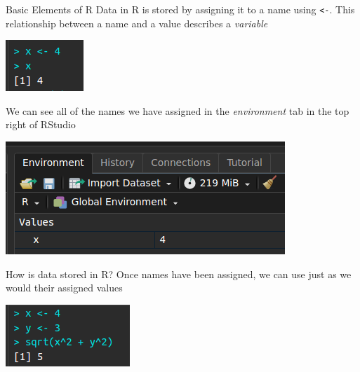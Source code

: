 \documentclass{beamer}
\begin{document}
\begin{frame}{Basic Elements of R}
Data in R is stored by assigning it to a name using \texttt{<-}. This relationship between a name and a value describes a \textit{variable}

\begin{center}
\includegraphics[scale=0.6]{r_assign_4.png}
\end{center}
We can see all of the names we have assigned in the \textit{environment} tab in the top right of RStudio
\begin{center}
\includegraphics[scale=0.5]{r_env.png}
\end{center}
\end{frame}

\begin{frame}{How is data stored in R?}
Once names have been assigned, we can use just as we would their assigned values

\begin{center}
\includegraphics[scale=0.75]{sum_sq.png}
\end{center}

\end{frame}
\end{document}
